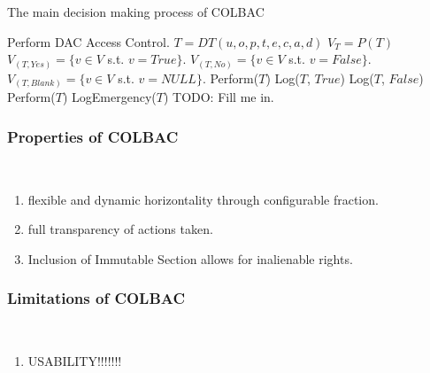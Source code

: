 \begin{algorithm}
\caption{The main decision making process of COLBAC}
\begin{algorithmic}[1]
    \State Perform DAC Access Control.
    \State $T = DT(u,o,p,t,e,c,a,d)$
        \State $V_{T} = P(T)$
        \State $V_{(T, Yes)} = \{v \in V$ s.t. $v = True\}.$
        \State $V_{(T, No)} = \{v \in V$ s.t. $v = False\}.$
        \State $V_{(T, Blank)} = \{v \in V$ s.t. $v = NULL\}$.
            \State Perform($T$)
            \State Log($T$, $True$)
        \Else
            \State Log($T$, $False$)
        \EndIf
    \Else
        \State Perform($T$)
        \State LogEmergency($T$)
    \EndIf
\Else
    \State TODO: Fill me in.
\EndIf
\end{algorithmic}
\end{algorithm}


\EndIf

\subsubsection{Properties of COLBAC}
\mbox{}\\
\begin{enumerate}
\item flexible and dynamic horizontality through configurable fraction.
\item full transparency of actions taken.
\item Inclusion of Immutable Section allows for inalienable rights.
\end{enumerate}

\subsubsection{Limitations of COLBAC}
\mbox{}\\
\begin{enumerate}
\item USABILITY!!!!!!!
\end{enumerate}
